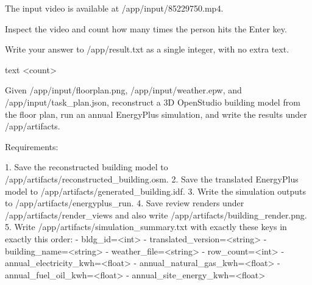 \begin{instructionbox}
The input video is available at \textasciigrave{}/app/input/85229750.mp4\textasciigrave{}.

Inspect the video and count how many times the person hits the Enter key.

Write your answer to \textasciigrave{}/app/result.txt\textasciigrave{} as a single integer, with no extra text.

\textasciigrave{}\textasciigrave{}\textasciigrave{}text
\textless{}count\textgreater{}
\textasciigrave{}\textasciigrave{}\textasciigrave{}
\end{instructionbox}

\begin{instructionbox}
Given \textasciigrave{}/app/input/floorplan.png\textasciigrave{}, \textasciigrave{}/app/input/weather.epw\textasciigrave{}, and \textasciigrave{}/app/input/task\_plan.json\textasciigrave{}, reconstruct a 3D OpenStudio building model from the floor plan, run an annual EnergyPlus simulation, and write the results under \textasciigrave{}/app/artifacts\textasciigrave{}.

Requirements:

1. Save the reconstructed building model to \textasciigrave{}/app/artifacts/reconstructed\_building.osm\textasciigrave{}.
2. Save the translated EnergyPlus model to \textasciigrave{}/app/artifacts/generated\_building.idf\textasciigrave{}.
3. Write the simulation outputs to \textasciigrave{}/app/artifacts/energyplus\_run\textasciigrave{}.
4. Save review renders under \textasciigrave{}/app/artifacts/render\_views\textasciigrave{} and also write \textasciigrave{}/app/artifacts/building\_render.png\textasciigrave{}.
5. Write \textasciigrave{}/app/artifacts/simulation\_summary.txt\textasciigrave{} with exactly these keys in exactly this order:
   - \textasciigrave{}bldg\_id=\textless{}int\textgreater{}\textasciigrave{}
   - \textasciigrave{}translated\_version=\textless{}string\textgreater{}\textasciigrave{}
   - \textasciigrave{}building\_name=\textless{}string\textgreater{}\textasciigrave{}
   - \textasciigrave{}weather\_file=\textless{}string\textgreater{}\textasciigrave{}
   - \textasciigrave{}row\_count=\textless{}int\textgreater{}\textasciigrave{}
   - \textasciigrave{}annual\_electricity\_kwh=\textless{}float\textgreater{}\textasciigrave{}
   - \textasciigrave{}annual\_natural\_gas\_kwh=\textless{}float\textgreater{}\textasciigrave{}
   - \textasciigrave{}annual\_fuel\_oil\_kwh=\textless{}float\textgreater{}\textasciigrave{}
   - \textasciigrave{}annual\_site\_energy\_kwh=\textless{}float\textgreater{}\textasciigrave{}


\end{instructionbox}
